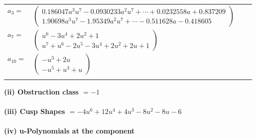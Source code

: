 \documentclass[1p]{elsarticle_modified}
\theoremstyle{definition}
\begin{document}
\begin{tabular}{m{7pt} m{180pt} m{7pt} m{180pt} }
\flushright $a_{3}=$&$\begin{pmatrix}0.186047 a^{3} u^{7}-0.0930233 a^{2} u^{7}+\cdots+0.0232558 a+0.837209\\1.90698 a^{3} u^{7}-1.95349 a^{2} u^{7}+\cdots-0.511628 a-0.418605\end{pmatrix}$ \\
\flushright $a_{7}=$&$\begin{pmatrix}u^6-3 u^4+2 u^2+1\\u^7+u^6-2 u^5-3 u^4+2 u^2+2 u+1\end{pmatrix}$ \\
\flushright $a_{10}=$&$\begin{pmatrix}- u^3+2 u\\- u^5+u^3+u\end{pmatrix}$\\&\end{tabular}
\flushleft \textbf{(ii) Obstruction class $= -1$}\\~\\
\flushleft \textbf{(iii) Cusp Shapes $= -4 u^6+12 u^4+4 u^3-8 u^2-8 u-6$}\\~\\
\newpage\renewcommand{\arraystretch}{1}
\flushleft \textbf{(iv) u-Polynomials at the component}\newline \\
\end{document}
